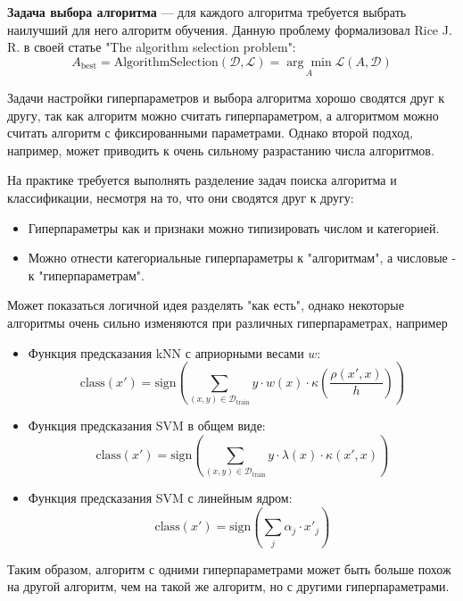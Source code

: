 \begin{definition}
    \textbf{Задача выбора алгоритма} --- для каждого алгоритма требуется выбрать наилучший для него алгоритм обучения.
Данную проблему формализовал Rice J. R. в своей статье "The algorithm selection problem":
\[
A_{\mathrm{best}} = \mathrm{AlgorithmSelection}(\mathcal{D}, \mathcal{L}) = \underset{A}{\arg\min}\mathcal{L}(A, \mathcal{D})
\]
\end{definition}

\begin{remark}
    Задачи настройки гиперпараметров и выбора алгоритма хорошо сводятся друг к другу, так как алгоритм можно считать гиперпараметром, а алгоритмом можно считать алгоритм с фиксированными параметрами. Однако второй подход, например, может приводить к очень сильному разрастанию числа алгоритмов.
\end{remark}

На практике требуется выполнять разделение задач поиска алгоритма и классификации, несмотря на то, что они сводятся друг к другу:
\begin{itemize}
    \item Гиперпараметры как и признаки можно типизировать числом и категорией.
    \item Можно отнести категориальные гиперпараметры к "алгоритмам", а числовые - к "гиперпараметрам".
\end{itemize}

\begin{remark}
    Может показаться логичной идея разделять "как есть", однако некоторые алгоритмы очень сильно изменяются при различных гиперпараметрах, например
    \begin{itemize}
        \item Функция предсказания kNN с априорными весами $w$:
        \[
            \mathrm{class}(x') = \mathrm{sign}\left(\sum_{(x,y)\in\mathcal{D}_\mathrm{train}} y\cdot w(x)\cdot\kappa\left(\dfrac{\rho\left(x', x\right)}{h}\right)\right)
        \]
        \item Функция предсказания SVM в общем виде:
        \[
            \mathrm{class}(x') = \mathrm{sign}\left(\sum_{(x,y)\in\mathcal{D}_\mathrm{train}}y\cdot\lambda(x)\cdot\kappa(x', x)\right)
        \]
        \item Функция предсказания SVM с линейным ядром:
        \[
            \mathrm{class}(x') = \mathrm{sign}\left(\sum_j \alpha_j\cdot x'_j\right)
        \]
    \end{itemize}
    Таким образом, алгоритм с одними гиперпараметрами может быть больше похож на другой алгоритм, чем на такой же алгоритм, но с другими гиперпараметрами.
\end{remark}

